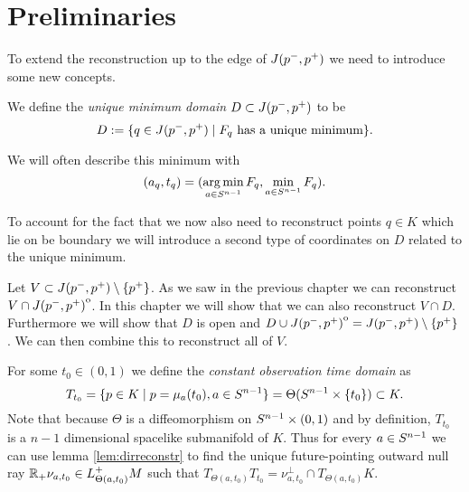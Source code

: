 \section{Preliminaries}
To extend the reconstruction up to the edge of $J(p^-,p^+)$ we need to introduce some new concepts.

\begin{definition}\label{def:uniquemindomain}
    We define the \emph{unique minimum domain} $D\subset J(p^-,p^+)$ to be 
    \begin{equation}
        D:=\{q\in J(p^-,p^+) \mid F_q\text{ has a unique minimum}\}.
    \end{equation}

    We will often describe this minimum with 
    \[
        (a_q,t_q)=(\operatorname*{arg\,min}_{a\in {S^{n-1}}} F_q, \min_{a\in {S^{n-1}}} F_q).
    \]
\end{definition}

\begin{remark}
    To account for the fact that we now also need to reconstruct points $q\in K$ which lie on be boundary we will introduce a second type of coordinates on $D$ related to the unique minimum.
    
    Let $V\subset J(p^-,p^+)\setminus \{p^+\}$. As we saw in the previous chapter we can reconstruct $V\cap {\kern0ptJ(p^-,p^+)}^{\mathrm{o}}$. In this chapter we will show that we can also reconstruct $V\cap D$. Furthermore we will show that $D$ is open and $D\cup {\kern0ptJ(p^-,p^+)}^{\mathrm{o}} = J(p^-,p^+)  \setminus \{p^+\}$. We can then combine this to reconstruct all of $V$.
\end{remark}


\begin{definition}\label{def:constobstime} For some $t_0\in (0,1)$ we define the \emph{constant observation time domain} as 
\begin{equation}
    T_{t_0} = \{p\in K \mid p=\mu_a(t_0), a\in {S^{n-1}}\} = \Theta({S^{n-1}}\times \{t_0\}) \subset K.
\end{equation}
Note that because $\Theta$ is a diffeomorphism on ${S^{n-1}} \times (0,1)$ and by definition, $T_{t_0}$ is a $n-1$ dimensional spacelike submanifold of $K$. 
Thus for every $a\in {S^{n-1}}$ we can use lemma \ref{lem:dirreconstr} to find the unique future-pointing outward null ray $\mathbb{R}_+\nu_{a,t_0}\in L^+_{\Theta(a,t_0)}M$ such that $T_{\Theta(a,t_0)}T_{t_0} = \nu_{a,t_0}^\perp \cap T_{\Theta(a,t_0)}K$.
\end{definition}

